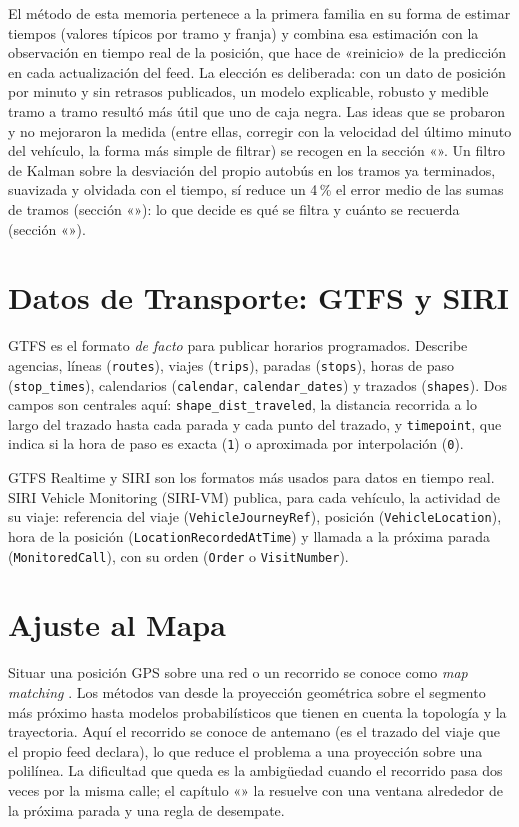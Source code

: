 El método de esta memoria pertenece a la primera familia en su forma de estimar tiempos (valores típicos por tramo y
franja) y combina esa estimación con la observación en tiempo real de la posición, que hace de «reinicio» de la predicción en cada
actualización del feed. La elección es deliberada: con un dato de posición por minuto y sin retrasos publicados, un
modelo explicable, robusto y medible tramo a tramo resultó más útil que uno de caja negra. Las ideas que se
probaron y no mejoraron la medida (entre ellas, corregir con la velocidad del último minuto del vehículo, la forma más
simple de filtrar) se recogen en la sección «». Un filtro de Kalman sobre la desviación del
propio autobús en los tramos ya terminados, suavizada y olvidada con el tiempo, sí reduce un 4\,\% el error medio de las
sumas de tramos (sección «»): lo que decide es qué se filtra y cuánto se recuerda
(sección «»).

\section{Datos de Transporte: GTFS y SIRI}

GTFS \citep{gtfs} es el formato \emph{de facto} para publicar horarios programados. Describe agencias, líneas
(\texttt{routes}), viajes (\texttt{trips}), paradas (\texttt{stops}), horas de paso (\texttt{stop\_times}),
calendarios (\texttt{calendar}, \texttt{calendar\_dates}) y trazados (\texttt{shapes}). Dos campos son centrales
aquí: \texttt{shape\_dist\_traveled}, la distancia recorrida a lo largo del trazado hasta cada parada y cada punto del
trazado, y \texttt{timepoint}, que indica si la hora de paso es exacta (\texttt{1}) o aproximada por interpolación
(\texttt{0}).

GTFS Realtime \citep{gtfsrt} y SIRI \citep{siri} son los formatos más usados para datos en tiempo real. SIRI Vehicle
Monitoring (SIRI-VM) publica, para cada vehículo, la actividad de su viaje: referencia del viaje
(\texttt{VehicleJourneyRef}), posición (\texttt{VehicleLocation}), hora de la posición
(\texttt{LocationRecordedAtTime}) y llamada a la próxima parada (\texttt{MonitoredCall}), con su orden
(\texttt{Order} o \texttt{VisitNumber}).

\section{Ajuste al Mapa}

Situar una posición GPS sobre una red o un recorrido se conoce como \emph{map matching} \citep{quddus2007}. Los
métodos van desde la proyección geométrica sobre el segmento más próximo hasta modelos probabilísticos que tienen en
cuenta la topología y la trayectoria. Aquí el recorrido se conoce de antemano (es el trazado del viaje
que el propio feed declara), lo que reduce el problema a una proyección sobre una polilínea. La dificultad que queda
es la ambigüedad cuando el recorrido pasa dos veces por la misma calle; el capítulo «» la resuelve
con una ventana alrededor de la próxima parada y una regla de desempate.

